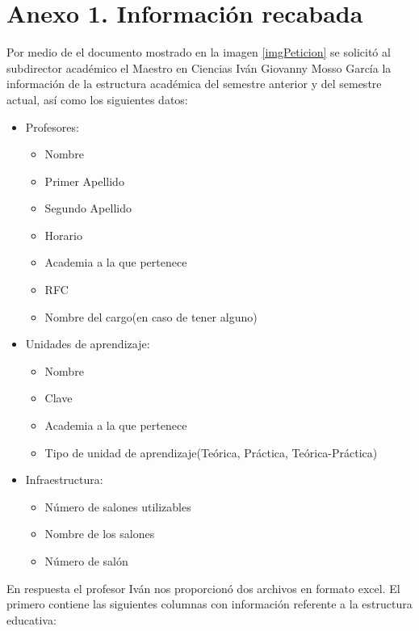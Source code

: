 \label{sec:Anexos}

\section{Anexo 1. Información recabada}

Por medio de el documento mostrado en la imagen \ref{imgPeticion} se solicitó al subdirector académico el Maestro en Ciencias Iván Giovanny Mosso García la información de la estructura académica del semestre anterior y del semestre actual, así como los siguientes datos:

\begin{itemize}
	\item Profesores:
		\begin{itemize}
			\item Nombre
			\item Primer Apellido
			\item Segundo Apellido
			\item Horario
			\item Academia a la que pertenece
			\item RFC
			\item Nombre del cargo(en caso de tener alguno)
		\end{itemize}	
	\item Unidades de aprendizaje:
		\begin{itemize}
			\item Nombre
			\item Clave
			\item Academia a la que pertenece
			\item Tipo de unidad de aprendizaje(Teórica, Práctica, Teórica-Práctica)
		\end{itemize}
	\item Infraestructura:
		\begin{itemize}
			\item Número de salones utilizables
			\item Nombre de los salones
			\item Número de salón
		\end{itemize}
\end{itemize}

En respuesta el profesor Iván nos proporcionó dos archivos en formato excel. El primero contiene las siguientes columnas con información referente a la estructura educativa: